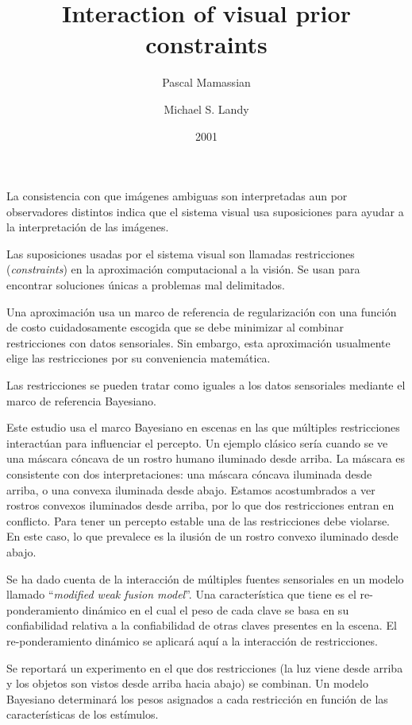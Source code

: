 \documentclass[a4paper,12pt]{article}
\title{Interaction of visual prior constraints}
\author{Pascal Mamassian \and Michael S. Landy}
\date{2001}
\begin{document}
{\scshape\bfseries \maketitle}

La consistencia con que imágenes ambiguas son interpretadas aun por observadores distintos indica que el sistema visual usa suposiciones para ayudar a la interpretación de las imágenes.

Las suposiciones usadas por el sistema visual son llamadas restricciones ({\itshape constraints}) en la aproximación computacional a la visión. Se usan para encontrar soluciones únicas a problemas mal delimitados.

Una aproximación usa un marco de referencia de regularización con una función de costo cuidadosamente escogida que se debe minimizar al combinar restricciones con datos sensoriales. Sin embargo, esta aproximación usualmente elige las restricciones por su conveniencia matemática.

Las restricciones se pueden tratar como iguales a los datos sensoriales mediante el marco de referencia Bayesiano.

Este estudio usa el marco Bayesiano en escenas en las que múltiples restricciones interactúan para influenciar el percepto. Un ejemplo clásico sería cuando se ve una máscara cóncava de un rostro humano iluminado desde arriba. La máscara es consistente con dos interpretaciones: una máscara cóncava iluminada desde arriba, o una convexa iluminada desde abajo. Estamos acostumbrados a ver rostros convexos iluminados desde arriba, por lo que dos restricciones entran en conflicto. Para tener un percepto estable una de las restricciones debe violarse. En este caso, lo que prevalece es la ilusión de un rostro convexo iluminado desde abajo.

Se ha dado cuenta de la interacción de múltiples fuentes sensoriales en un modelo llamado ``{\itshape modified weak fusion model}''. Una característica que tiene es el re-ponderamiento dinámico en el cual el peso de cada clave se basa en su confiabilidad relativa a la confiabilidad de otras claves presentes en la escena. El re-ponderamiento dinámico se aplicará aquí a la interacción de restricciones.

Se reportará un experimento en el que dos restricciones (la luz viene desde arriba y los objetos son vistos desde arriba hacia abajo) se combinan. Un modelo Bayesiano determinará los pesos asignados a cada restricción en función de las características de los estímulos.
\end{document}
